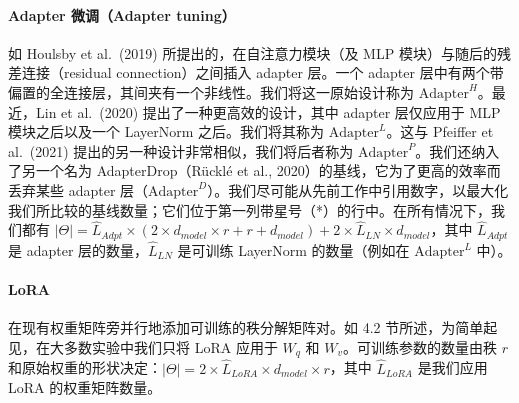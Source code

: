 \documentclass[11pt,UTF8,fontset=fandol]{ctexart}
\begin{document}
\paragraph{Adapter 微调（Adapter tuning）}如 Houlsby et al.\ (2019) 所提出的，在自注意力模块（及 MLP 模块）与随后的残差连接（residual connection）之间插入 adapter 层。一个 adapter 层中有两个带偏置的全连接层，其间夹有一个非线性。我们将这一原始设计称为 $\text{Adapter}^H$。最近，Lin et al.\ (2020) 提出了一种更高效的设计，其中 adapter 层仅应用于 MLP 模块之后以及一个 LayerNorm 之后。我们将其称为 $\text{Adapter}^L$。这与 Pfeiffer et al.\ (2021) 提出的另一种设计非常相似，我们将后者称为 $\text{Adapter}^P$。我们还纳入了另一个名为 AdapterDrop（Rücklé et al., 2020）的基线，它为了更高的效率而丢弃某些 adapter 层（$\text{Adapter}^D$）。我们尽可能从先前工作中引用数字，以最大化我们所比较的基线数量；它们位于第一列带星号（*）的行中。在所有情况下，我们都有 $|\Theta|=\hat{L}_{Adpt}\times(2\times d_{model}\times r+r+d_{model})+2\times\hat{L}_{LN}\times d_{model}$，其中 $\hat{L}_{Adpt}$ 是 adapter 层的数量，$\hat{L}_{LN}$ 是可训练 LayerNorm 的数量（例如在 $\text{Adapter}^L$ 中）。

\paragraph{LoRA}在现有权重矩阵旁并行地添加可训练的秩分解矩阵对。如 4.2 节所述，为简单起见，在大多数实验中我们只将 LoRA 应用于 $W_q$ 和 $W_v$。可训练参数的数量由秩 $r$ 和原始权重的形状决定：$|\Theta|=2\times\hat{L}_{LoRA}\times d_{model}\times r$，其中 $\hat{L}_{LoRA}$ 是我们应用 LoRA 的权重矩阵数量。
\end{document}
